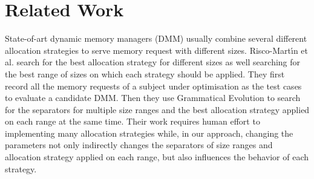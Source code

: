 \section{Related Work}

State-of-art dynamic memory managers (DMM) usually combine several different allocation strategies to serve memory request with different sizes. Risco-Mart\'{\i}n et al. \cite{RiscoMartín2014109, Colmenar:2011:MOD:2001576.2001820} search for the best allocation strategy for different sizes as well searching for the best range of sizes on which each strategy should be applied. They first record all the memory requests of a subject under optimisation as the test cases to evaluate a candidate DMM. Then they use Grammatical Evolution to search for the separators for multiple size ranges and the best allocation strategy applied on each range at the same time. Their work requires human effort to implementing many allocation strategies while, in our approach, changing the parameters not only indirectly changes the separators of size ranges and allocation strategy applied on each range, but also influences the behavior of each strategy.



